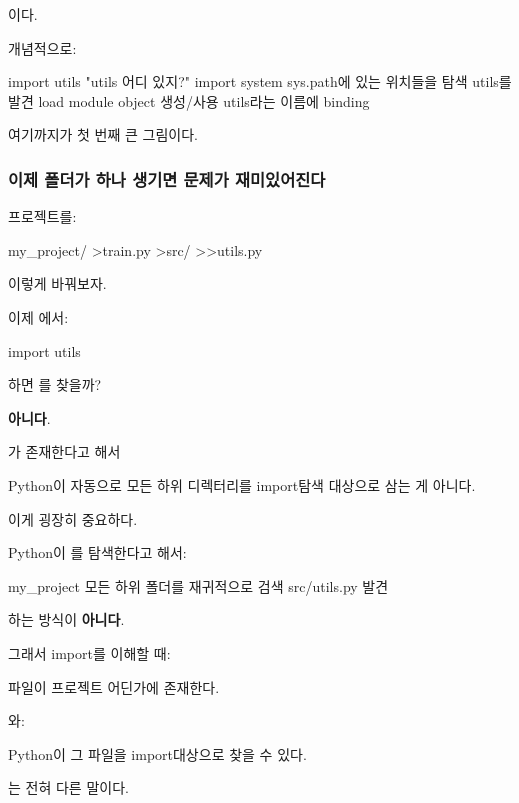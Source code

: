 이다.

개념적으로:

\begin{dhksmry}[centered]
import utils
\da
"utils 어디 있지?"
\da
import system
\da
sys.path에 있는 위치들을 탐색
\da
utils를 발견
\da
load
\da
module object 생성/사용
\da
utils라는 이름에 binding
\end{dhksmry}

여기까지가 첫 번째 큰 그림이다.

\subsubsection{이제 폴더가 하나 생기면 문제가 재미있어진다}

프로젝트를:

\begin{dhkdir}
my_project/
>train.py
>src/
>>utils.py
\end{dhkdir}

이렇게 바꿔보자.

이제 에서:

\begin{dhkcode}
import utils
\end{dhkcode}

하면 를 찾을까?

\textbf{아니다}.

가 존재한다고 해서 

Python이 자동으로 모든 하위 디렉터리를 import탐색 대상으로 삼는 게 아니다.

이게 굉장히 중요하다.

Python이 를 탐색한다고 해서:

\begin{dhksmry}[centered]
my_project
\da
모든 하위 폴더를 재귀적으로 검색
\da
src/utils.py 발견
\end{dhksmry}

하는 방식이 \textbf{아니다}.

그래서 import를 이해할 때:

\begin{dhksmry}[centered]
파일이 프로젝트 어딘가에 존재한다.
\end{dhksmry}

와:

\begin{dhksmry}[centered]
Python이 그 파일을 import대상으로 찾을 수 있다.
\end{dhksmry}

는 전혀 다른 말이다.

